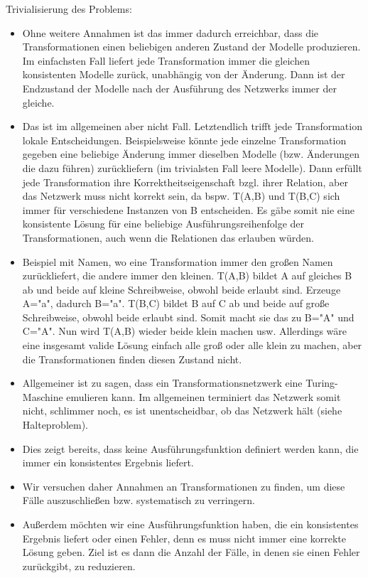 Trivialisierung des Problems:
\begin{itemize}
    \item Ohne weitere Annahmen ist das immer dadurch erreichbar, dass die Transformationen einen beliebigen anderen Zustand der Modelle produzieren. Im einfachsten Fall liefert jede Transformation immer die gleichen konsistenten Modelle zurück, unabhängig von der Änderung. Dann ist der Endzustand der Modelle nach der Ausführung des Netzwerks immer der gleiche.
    \item Das ist im allgemeinen aber nicht Fall. Letztendlich trifft jede Transformation lokale Entscheidungen. Beispielsweise könnte jede einzelne Transformation gegeben eine beliebige Änderung immer dieselben Modelle (bzw. Änderungen die dazu führen) zurückliefern (im trivialsten Fall leere Modelle). Dann erfüllt jede Transformation ihre Korrektheitseigenschaft bzgl. ihrer Relation, aber das Netzwerk muss nicht korrekt sein, da bspw. T(A,B) und T(B,C) sich immer für verschiedene Instanzen von B entscheiden. Es gäbe somit nie eine konsistente Lösung für eine beliebige Ausführungsreihenfolge der Transformationen, auch wenn die Relationen das erlauben würden.
    \item Beispiel mit Namen, wo eine Transformation immer den großen Namen zurückliefert, die andere immer den kleinen. T(A,B) bildet A auf gleiches B ab und beide auf kleine Schreibweise, obwohl beide erlaubt sind. Erzeuge A="a", dadurch B="a". T(B,C) bildet B auf C ab und beide auf große Schreibweise, obwohl beide erlaubt sind. Somit macht sie das zu B="A" und C="A". Nun wird T(A,B) wieder beide klein machen usw. Allerdings wäre eine insgesamt valide Lösung einfach alle groß oder alle klein zu machen, aber die Transformationen finden diesen Zustand nicht. 
    \item Allgemeiner ist zu sagen, dass ein Transformationsnetzwerk eine Turing-Maschine emulieren kann. 
    Im allgemeinen terminiert das Netzwerk somit nicht, schlimmer noch, es ist unentscheidbar, ob das Netzwerk hält (siehe Halteproblem).
    \item Dies zeigt bereits, dass keine Ausführungsfunktion definiert werden kann, die immer ein konsistentes Ergebnis liefert.
    \item Wir versuchen daher Annahmen an Transformationen zu finden, um diese Fälle auszuschließen bzw. systematisch zu verringern. 
    \item Außerdem möchten wir eine Ausführungsfunktion haben, die ein konsistentes Ergebnis liefert oder einen Fehler, denn es muss nicht immer eine korrekte Lösung geben. Ziel ist es dann die Anzahl der Fälle, in denen sie einen Fehler zurückgibt, zu reduzieren.
\end{itemize}


